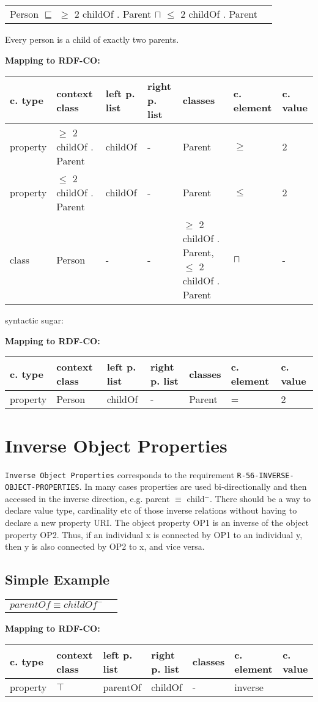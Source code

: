 \documentclass{llncs}
\newcommand{\ms}[1]{\texttt{#1}}
\newenvironment{gcotable}{
  \scriptsize
  \sffamily
  \vspace{0cm}
	\begin{center}
	\textbf{\vspace{0.4cm}Mapping to RDF-CO:} \\
  \begin{tabular}{l|l|l|l|l|l|l}
	\hline
  \textbf{c. type} & \textbf{context class} & \textbf{left p. list} & \textbf{right p. list} & \textbf{classes} & \textbf{c. element} & \textbf{c. value} \\
  \hline

}{
  \hline
  \end{tabular}
	\end{center}
}
\newenvironment{DL}{
  \vspace{0cm}
	\begin{center}
  \begin{tabular}{r l}

}{
  \end{tabular}
	\end{center}
}
\begin{document}
\begin{DL}
Person $\sqsubseteq$ $\geq$ 2 childOf . Parent $\sqcap$ $\leq$  2 childOf . Parent \\
\end{DL}

Every person is a child of exactly two parents.

\begin{gcotable}
property & $\geq$ 2 childOf . Parent & childOf & - & Parent & $\geq$ & 2 \\
property & $\leq$ 2 childOf . Parent & childOf & - & Parent & $\leq$ & 2 \\
class & Person & - & - & $\geq$ 2 childOf . Parent, $\leq$ 2 childOf . Parent & $\sqcap$ & - \\
\end{gcotable}

syntactic sugar:

\begin{gcotable}
property & Person & childOf & - & Parent & = & 2 \\
\end{gcotable}

\section{Inverse Object Properties}

\ms{Inverse Object Properties} corresponds to the requirement
\ms{R-56-INVERSE-} \ms{OBJECT-PROPERTIES}.
In many cases properties are used bi-directionally and then accessed in the inverse direction, e.g. parent $\equiv$ child$^{-}$. There should be a way to declare value type, cardinality etc of those inverse relations without having to declare a new property URI. 
The object property OP1 is an inverse of the object property OP2. 
Thus, if an individual x is connected by OP1 to an individual y, then y is also connected by OP2 to x, and vice versa.

\subsection{Simple Example}

\begin{DL}
$parentOf \equiv childOf^{-}$ \\
\end{DL}

\begin{gcotable}
property & $\top$ & parentOf & childOf & - & inverse \\
\end{gcotable}
\end{document}
